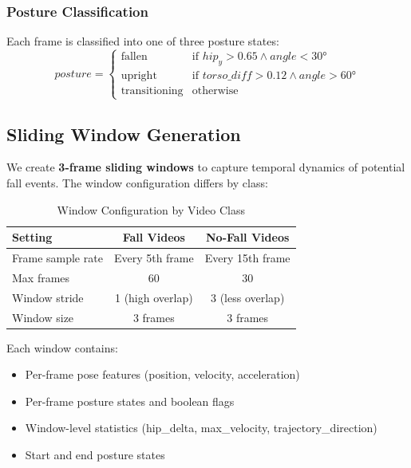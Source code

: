 \documentclass[conference]{IEEEtran}
\begin{document}
\subsubsection{Posture Classification}
Each frame is classified into one of three posture states:
\begin{equation}
    posture = \begin{cases}
        \text{fallen} & \text{if } hip_y > 0.65 \land angle < 30° \\
        \text{upright} & \text{if } torso\_diff > 0.12 \land angle > 60° \\
        \text{transitioning} & \text{otherwise}
    \end{cases}
\end{equation}

\subsection{Sliding Window Generation}

We create \textbf{3-frame sliding windows} to capture temporal dynamics of potential fall events. The window configuration differs by class:

\begin{table}[H]
\centering
\caption{Window Configuration by Video Class}
\label{tab:window_config}
\begin{tabular}{lcc}
\toprule
\textbf{Setting} & \textbf{Fall Videos} & \textbf{No-Fall Videos} \\
\midrule
Frame sample rate & Every 5th frame & Every 15th frame \\
Max frames & 60 & 30 \\
Window stride & 1 (high overlap) & 3 (less overlap) \\
Window size & 3 frames & 3 frames \\
\bottomrule
\end{tabular}
\end{table}

Each window contains:
\begin{itemize}[leftmargin=*]
    \item Per-frame pose features (position, velocity, acceleration)
    \item Per-frame posture states and boolean flags
    \item Window-level statistics (hip\_delta, max\_velocity, trajectory\_direction)
    \item Start and end posture states
\end{itemize}
\end{document}
